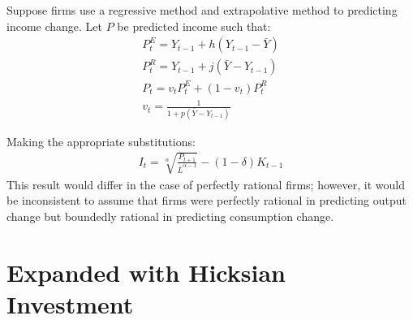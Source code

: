 \documentclass[]{article}
\begin{document}
Suppose firms use a regressive method and extrapolative method to predicting income change. Let $P$ be predicted income such that:
\begin{gather*}
	P_t^E = Y_{t-1} + h(Y_{t-1} - \bar Y)\\
	P_t^R = Y_{t-1} + j(\bar Y - Y_{t-1})\\
	P_t = v_t P_t^E + (1-v_t) P^R_t\\
	v_t = \frac{1}{1 + p(\bar Y - Y_{t-1})}
\end{gather*}

Making the appropriate substitutions:
\begin{gather*}
	I_{t} = \sqrt[\alpha]{\frac{P_{t+1}}{\bar L^{\alpha-1}}} - (1-\delta) K_{t-1}
\end{gather*}
This result would differ in the case of perfectly rational firms; however, it would be inconsistent to assume that firms were perfectly rational in predicting output change but boundedly rational in predicting consumption change.
\section{Expanded with Hicksian Investment}
\end{document}
